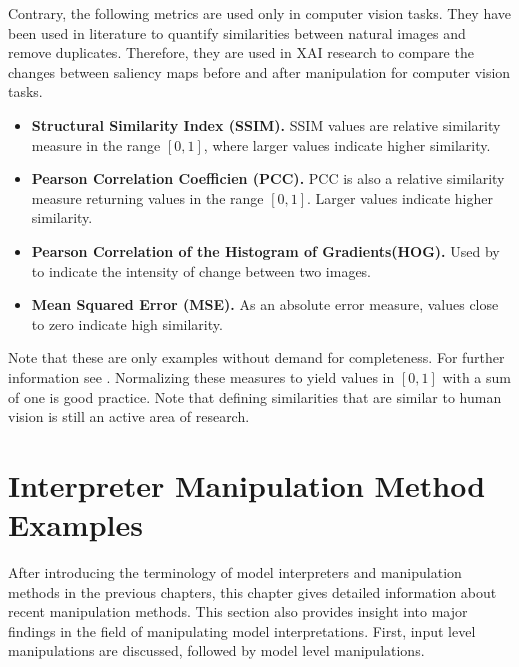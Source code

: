 \documentclass[sigconf]{acmart}
\begin{document}
Contrary, the following metrics are used only in computer vision tasks. They have been used in literature to quantify similarities between natural images and remove duplicates. Therefore, they are used in XAI research to compare the changes between saliency maps before and after manipulation for computer vision tasks.
\begin{itemize}
    \item \textbf{Structural Similarity Index (SSIM).} SSIM values are relative similarity measure in the range $\left[0, 1\right]$, where larger values indicate higher similarity.
    \item \textbf{Pearson Correlation Coefficien (PCC).} PCC is also a relative similarity measure returning values in the range $\left[0, 1\right]$. Larger values indicate higher similarity.
    \item \textbf{Pearson Correlation of the Histogram of Gradients\newline (HOG). } Used by \cite{adebayo2018sanity} to indicate the intensity of change between two images. 
    \item \textbf{Mean Squared Error (MSE).} As an absolute error measure, values close to zero indicate high similarity. 
\end{itemize}

\noindent Note that these are only examples without demand for completeness. For further information see \cite{adebayo2018sanity}.
Normalizing these measures to yield values in $\left[0, 1\right]$ with a sum of one is good practice. 
Note that defining similarities that are similar to human vision is still an active area of research. 

% 
\section{Interpreter Manipulation Method Examples}
\label{sec:manipulations}

After introducing the terminology of model interpreters and manipulation methods in the previous chapters, this chapter gives detailed information about recent manipulation methods. This section also provides insight into major findings in the field of manipulating model interpretations. First, input level manipulations are discussed, followed by model level manipulations. 
\end{document}
